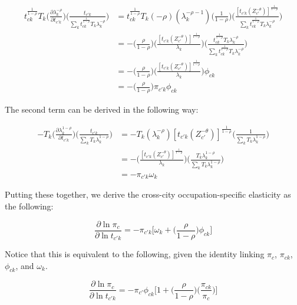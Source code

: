 \documentclass[10pt]{article}
\begin{document}
\begin{align*}
    {t^{\frac{1}{1-\rho}}_{ck}}{T_{k}}\Big(\frac{\partial\lambda_{k}^{-\rho}}{\partial{t_{{c'}k}}}\Big)\Big(\frac{t_{{c'}k}}{{\sum\limits_{k}{t^{\frac{1}{1-\rho}}_{ck}}{T_{k}}\lambda_{k}^{-\rho}}}\Big) & = {t^{\frac{1}{1-\rho}}_{ck}}{T_{k}}(-\rho)(\lambda_{k}^{-\rho-1})\Big(\frac{1}{1-\rho}\Big)\Bigg(\frac{[{t_{{c'}k}}(Z_{c'}^{-\theta})]^{\frac{1}{1-\rho}}}{{\sum\limits_{k}{t^{\frac{1}{1-\rho}}_{ck}}{T_{k}}\lambda_{k}^{-\rho}}}\Bigg) \\ &= -\Bigg(\frac{\rho}{1-\rho}\Bigg)\Bigg(\frac{[{t_{{c'}k}}(Z_{c'}^{-\theta})]^{\frac{1}{1-\rho}}}{\lambda_{k}}\Bigg)\Bigg(\frac{t^{\frac{1}{1-\rho}}_{ck}{T_{k}}{\lambda^{-\rho}_{k}}}{{\sum\limits_{k}{t^{\frac{1}{1-\rho}}_{ck}}{T_{k}}\lambda_{k}^{-\rho}}}\Bigg)\\ &= -\Bigg(\frac{\rho}{1-\rho}\Bigg)\Bigg(\frac{[{t_{{c'}k}}(Z_{c'}^{-\theta})]^{\frac{1}{1-\rho}}}{\lambda_{k}}\Bigg){\phi_{ck}}\\ &= -\Big(\frac{\rho}{1-\rho}\Big){\pi_{{c'}k}}{\phi_{ck}}
\end{align*}

The second term can be derived in the following way:

\begin{align*}
    - {T_{k}}\Big(\frac{\partial\lambda_{k}^{1-\rho}}{\partial{t_{{c'}k}}}\Big)\Big(\frac{t_{{c'}k}}{{\sum\limits_{k}{T_{k}}\lambda_{k}^{1-\rho}}}\Big) & = - {T_{k}}(\lambda_{k}^{-\rho})[{t_{{c'}k}}(Z_{c'}^{-\theta})]^{\frac{1}{1-\rho}}\Big(\frac{1}{{\sum\limits_{k}{T_{k}}\lambda_{k}^{1-\rho}}}\Big) \\ &= - \Bigg(\frac{[{t_{{c'}k}}(Z_{c'}^{-\theta})]^{\frac{1}{1-\rho}}}{\lambda_{k}}\Bigg)\Big(\frac{{T_{k}}{\lambda_{k}^{1-\rho}}}{{\sum\limits_{k} T_k \lambda_{k}^{1-\rho}}}\Big)\\ &= -\pi_{{c'}k}{\omega_{k}}
\end{align*}

Putting these together, we derive the cross-city occupation-specific elasticity as the following:

\begin{equation*}
    \frac{\partial\ln{\pi_{c}}}{\partial\ln{t_{{c'}k}}} = -{\pi_{{c'}k}}\Big[\omega_{k}+\Big(\frac{\rho}{1-\rho}\Big)\phi_{ck}]
\end{equation*}

Notice that this is equivalent to the following, given the identity linking $\pi_{c}$, $\pi_{ck}$, $\phi_{ck}$, and $\omega_{k}$.

\begin{equation}
    \frac{\partial\ln{\pi_{c}}}{\partial\ln{t_{{c'}k}}} = -{\pi_{c'}}{\phi_{ck}}\Big[1+\Big(\frac{\rho}{1-\rho}\Big)\Big(\frac{\pi_{ck}}{\pi_{c}}\Big)\Big]
\end{equation}
\end{document}
